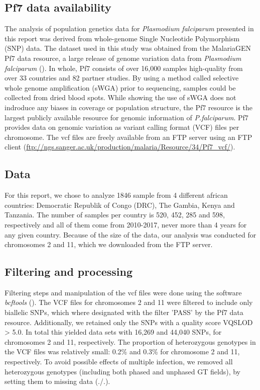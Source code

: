 \documentclass[11pt]{article}
\begin{document}
\subsection*{Pf7 data availability}
\label{sec:orge89be26}
The analysis of population genetics data for \emph{Plasmodium falciparum} presented in this report was derived from whole-genome Single Nucleotide Polymorphism (SNP) data. The dataset used in this study was obtained from the MalariaGEN Pf7 data resource, a large release of genome variation data from \emph{Plasmodium falciparum} (\cite{MalariaGEN-2023-pf7}). In whole, Pf7 consists of over 16,000 samples high-quality from over 33 countries and 82 partner studies. By using a method called selective whole genome amplification (sWGA) prior to sequencing, samples could be collected from dried blood spots. While showing the use of sWGA does not indroduce any biases in coverage or population structure, the Pf7 resource is the largest publicly available resource for genomic information of \emph{P.falciparum}. Pf7 provides data on genomic variation as variant calling format (VCF) files per chromosome. The vcf files are freely available from an FTP server using an FTP client (\url{ftp://ngs.sanger.ac.uk/production/malaria/Resource/34/Pf7\_vcf/}).

\subsection*{Data}
\label{sec:orgeb03b20}
For this report, we chose to analyze 1846 sample from 4 different african countries: Democratic Republik of Congo (DRC), The Gambia, Kenya and Tanzania. The number of samples per country is 520, 452, 285 and 598, respectively and all of them come from 2010-2017, never more than 4 years for any given country. Because of the size of the data, our analysis was conducted for chromosomes 2 and 11, which we downloaded from the FTP server.

\subsection*{Filtering and processing}
\label{sec:org3643fd9}
Filtering steps and manipulation of the vcf files were done using the software \emph{bcftools} (\cite{danecek-2021-twelv-years}). The VCF files for chromosomes 2 and 11 were filtered to include only biallelic SNPs, which where designated with the filter 'PASS' by the Pf7 data resource. Additionally, we retained only the SNPs with a quality score VQSLOD > 5.0. In total this yielded data sets with 16,269 and 44,040 SNPs, for chromosomes 2 and 11, respectively.
The proportion of heterozygous genotypes in the VCF files was relatively small: 0.2\% and 0.3\% for chromosome 2 and 11, respectively. To avoid possible effects of multiple infection, we removed all heterozygous genotypes (including both phased and unphased GT fields), by setting them to missing data (./.).
\end{document}
